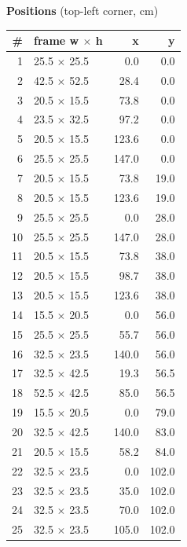 \documentclass[a4paper,landscape,10pt]{article}
\begin{document}
\begin{minipage}[t]{0.25\textwidth}
\vspace{8pt}
{\bfseries Positions} (top-left corner, cm)\\[2pt]
\tiny
\begin{tabular}{@{}r l r r@{}}
\toprule
\# & frame w $\times$ h & x & y \\
\midrule
1 & 25.5 $\times$ 25.5 & 0.0 & 0.0 \\
2 & 42.5 $\times$ 52.5 & 28.4 & 0.0 \\
3 & 20.5 $\times$ 15.5 & 73.8 & 0.0 \\
4 & 23.5 $\times$ 32.5 & 97.2 & 0.0 \\
5 & 20.5 $\times$ 15.5 & 123.6 & 0.0 \\
6 & 25.5 $\times$ 25.5 & 147.0 & 0.0 \\
7 & 20.5 $\times$ 15.5 & 73.8 & 19.0 \\
8 & 20.5 $\times$ 15.5 & 123.6 & 19.0 \\
9 & 25.5 $\times$ 25.5 & 0.0 & 28.0 \\
10 & 25.5 $\times$ 25.5 & 147.0 & 28.0 \\
11 & 20.5 $\times$ 15.5 & 73.8 & 38.0 \\
12 & 20.5 $\times$ 15.5 & 98.7 & 38.0 \\
13 & 20.5 $\times$ 15.5 & 123.6 & 38.0 \\
14 & 15.5 $\times$ 20.5 & 0.0 & 56.0 \\
15 & 25.5 $\times$ 25.5 & 55.7 & 56.0 \\
16 & 32.5 $\times$ 23.5 & 140.0 & 56.0 \\
17 & 32.5 $\times$ 42.5 & 19.3 & 56.5 \\
18 & 52.5 $\times$ 42.5 & 85.0 & 56.5 \\
19 & 15.5 $\times$ 20.5 & 0.0 & 79.0 \\
20 & 32.5 $\times$ 42.5 & 140.0 & 83.0 \\
21 & 20.5 $\times$ 15.5 & 58.2 & 84.0 \\
22 & 32.5 $\times$ 23.5 & 0.0 & 102.0 \\
23 & 32.5 $\times$ 23.5 & 35.0 & 102.0 \\
24 & 32.5 $\times$ 23.5 & 70.0 & 102.0 \\
25 & 32.5 $\times$ 23.5 & 105.0 & 102.0 \\
\bottomrule
\end{tabular}
\end{minipage}
\clearpage
\end{document}
